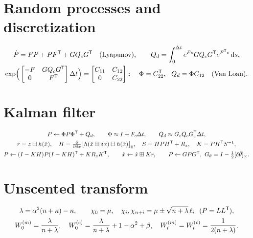 \section*{Random processes and discretization}
\begin{gather*}
  \dot P = FP + PF^{\mathsf{T}} + GQ_cG^{\mathsf{T}} \quad \text{(Lyapunov)}, \qquad
  Q_d = \int_0^{\Delta t} e^{Fs}GQ_cG^{\mathsf{T}} e^{F^{\mathsf{T}} s}\,\mathrm{d} s, \\
  \exp\!\Big(\begin{bmatrix} -F & GQ_cG^{\mathsf{T}} \\ 0 & F^{\mathsf{T}}\end{bmatrix}{\Delta t}\Big) = \begin{bmatrix} C_{11} & C_{12} \\ 0 & C_{22}\end{bmatrix}:\quad
  \Phi = C_{22}^{\mathsf{T}},\ \ Q_d = \Phi C_{12} \quad \text{(Van Loan)} .
\end{gather*}

\section*{Kalman filter}
\begin{gather*}
  P \gets \Phi P\Phi^{\mathsf{T}} + Q_d, \qquad \Phi \approx I + F_c{\Delta t}, \qquad Q_d \approx G_cQ_cG_c^{\mathsf{T}}{\Delta t}, \\
  r = z\boxminus h(\hat x), \quad H = \tfrac{\partial}{\partial\delta x}\big[h(\hat x\boxplus\delta x)\boxminus h(\hat x)\big]_0, \quad
  S = HPH^{\mathsf{T}} + R_z, \quad K = PH^{\mathsf{T}} S^{-1}, \\
  P \gets (I - KH)P(I - KH)^{\mathsf{T}} + KR_zK^{\mathsf{T}}, \qquad \hat x \gets \hat x\boxplus Kr, \qquad P \gets GPG^{\mathsf{T}},\ G_\theta = I - \tfrac12[\delta\hat\theta]_{\times}.
\end{gather*}

\section*{Unscented transform}
\begin{gather*}
  \lambda = \alpha^2(n + \kappa) - n, \qquad \chi_0 = \mu, \quad \chi_{i}, \chi_{n+i} = \mu \pm \sqrt{n + \lambda}\,\ell_i \ \ (P = LL^{\mathsf{T}}), \\
  W_0^{(m)} = \frac{\lambda}{n + \lambda}, \quad W_0^{(c)} = \frac{\lambda}{n + \lambda} + 1 - \alpha^2 + \beta, \quad W_i^{(m)} = W_i^{(c)} = \frac{1}{2(n + \lambda)} .
\end{gather*}

